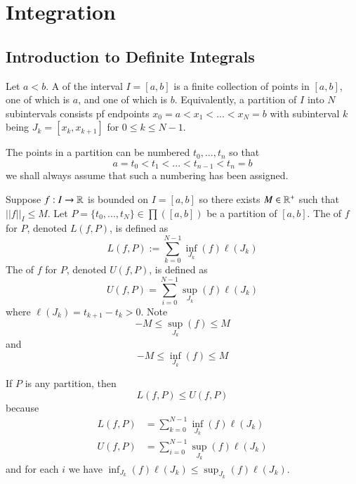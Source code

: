 \chapter{Integration}

\section{Introduction to Definite Integrals}

\begin{defn}
    Let $a < b$. A  of the interval $I= [a,b]$ is a finite collection of points in $[a,b]$, one of which is $a$, and one of which is $b$. Equivalently, a partition of $I$ into $N$ subintervals consists pf endpoints $x_0 = a<x_1 < ... < x_N = b$ with subinterval $k$ being $J_k = [x_k,x_{k+1}]$ for $0 \leq k \leq N-1$.
\end{defn}
The points in a partition can be numbered $t_0,...,t_n$ so that \begin{equation}
    a = t_0 < t_1 < ... < t_{n-1} < t_n = b
\end{equation}
we shall always assume that such a numbering has been assigned.

\begin{defn}
    Suppose $f:I\rightarrow \mathbb R$ is bounded on $I=[a,b]$ so there exists $M \in \mathbb R^+$ such that $||f||_I \leq M$. Let $P = \{t_0,...,t_N\} \in \prod([a,b])$ be a partition of $[a,b]$. The  of $f$ for $P$, denoted $L(f,P)$, is defined as \begin{equation}
        L(f,P) := \sum\limits_{k=0}^{N-1}\inf_{J_k}(f)\ell(J_k)
    \end{equation}
    The  of $f$ for $P$, denoted $U(f,P)$, is defined as \begin{equation}
        U(f,P) = \sum\limits_{i=0}^{N-1}\sup_{J_k}(f)\ell(J_k)
    \end{equation}
    where $\ell(J_k) = t_{k+1} - t_k > 0$. Note $$-M \leq \sup_{J_k}(f) \leq M$$ and $$-M\leq \inf_{J_k}(f) \leq M$$
\end{defn}


\begin{rmk}
    If $P$ is any partition, then \begin{equation}
        L(f,P) \leq U(f,P)
    \end{equation}
    because \begin{align*}
        L(f,P) &= \sum\limits_{k=0}^{N-1}\inf_{J_k}(f)\ell(J_k) \\
        U(f,P) &= \sum\limits_{i=0}^{N-1}\sup_{J_k}(f)\ell(J_k)
    \end{align*}
    and for each $i$ we have $\inf_{J_k}(f)\ell(J_k) \leq \sup_{J_k}(f)\ell(J_k)$.
\end{rmk}

